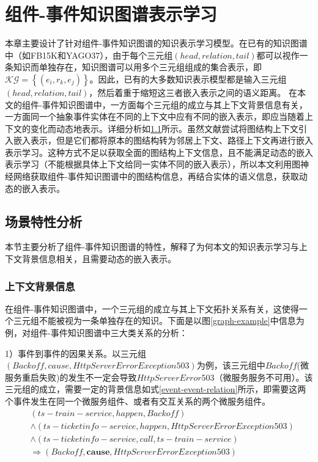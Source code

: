 \chapter{组件-事件知识图谱表示学习}
本章主要设计了针对组件-事件知识图谱的知识表示学习模型。在已有的知识图谱中（如FB15K\cite{bordes2013translatingE}和YAGO37\cite{guo2018knowledge}），由于每个三元组$\left(head, relation, tail\right)$都可以视作一条知识而单独存在，知识图谱可以用多个三元组组成的集合表示，即 $\mathcal{KG}=\left\{\left(e_{i}, r_{k}, e_{j}\right)\right\}$。因此，已有的大多数知识表示模型都是输入三元组$\left(head, relation, tail\right)$，然后着重于缩短这三者嵌入表示之间的语义距离。
在本文的组件-事件知识图谱中，一方面每个三元组的成立与其上下文背景信息有关，一方面同一个抽象事件实体在不同的上下文中应有不同的嵌入表示，即应当随着上下文的变化而动态地表示。详细分析如\ref{backgroud-analysis}所示。虽然文献\parencite{feng2016gake,shi2017knowledge}尝试将图结构上下文引入嵌入表示，但是它们都将原本的图结构转为邻居上下文、路径上下文再进行嵌入表示学习。这种方式不足以获取全面的图结构上下文信息，且不能满足动态的嵌入表示学习（不能根据具体上下文给同一实体不同的嵌入表示），所以本文利用图神经网络获取组件-事件知识图谱中的图结构信息，再结合实体的语义信息，获取动态的嵌入表示。
\section{场景特性分析}\label{backgroud-analysis}
本节主要分析了组件-事件知识图谱的特性，解释了为何本文的知识表示学习与上下文背景信息相关，且需要动态的嵌入表示。

\subsection{上下文背景信息}\label{context-analysis}
在组件-事件知识图谱中，一个三元组的成立与其上下文拓扑关系有关，这使得一个三元组不能被视为一条单独存在的知识。下面是以图\ref{graph-example}中信息为例，对组件-事件知识图谱中三大类关系的分析：

1）事件到事件的因果关系。以三元组$\left(Backoff, cause, HttpServerError Exception 503\right)$为例，该三元组中$Backoff$(微服务重启失败)的发生不一定会导致$HttpServerError 503$（微服务服务不可用）。该三元组的成立，需要一定的背景信息如式\ref{event-event-relation}所示，即需要这两个事件发生在同一个微服务组件、或者有交互关系的两个微服务组件。
\begin{equation}
    \begin{aligned}
        &\left ( ts-train-service, happen, Backoff \right ) \\
        &\wedge \left ( ts-ticketinfo-service, happen, HttpServerError Exception 503 \right ) \\
        &\wedge \left ( ts-ticketinfo-service, call, ts-train-service \right ) \\
        &\Rightarrow \left ( Backoff, \boldsymbol{cause}, HttpServerError Exception 503 \right )
    \end{aligned}
\label{event-event-relation}
\end{equation}

